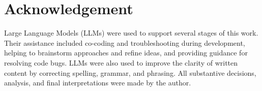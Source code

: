 %
\chapter*{Acknowledgement}
\label{sec:acknowledgement}
\vspace*{-10mm}

Large Language Models (LLMs) were used to support several stages of this work. Their assistance included co-coding and troubleshooting during development, helping to brainstorm approaches and refine ideas, and providing guidance for resolving code bugs. LLMs were also used to improve the clarity of written content by correcting spelling, grammar, and phrasing. All substantive decisions, analysis, and final interpretations were made by the author.
